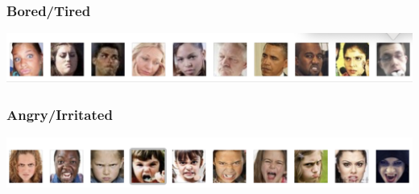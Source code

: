   \subsubsection*{Bored/Tired}
  \includegraphics[width=\linewidth]{resources/bored-carousel.png}
  \subsubsection*{Angry/Irritated}
  \includegraphics[width=\linewidth]{resources/angry-carousel.png}

